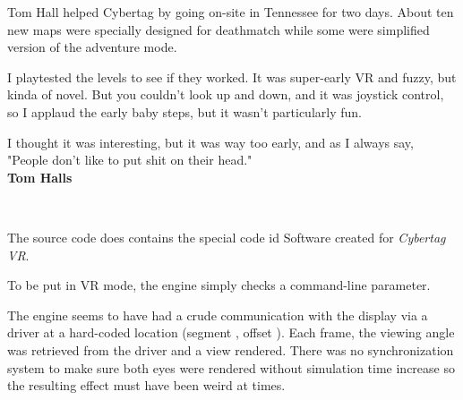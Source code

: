 \begin{figure}[H]
  \centering
{}
 
\end{figure}
\par
Tom Hall helped Cybertag by going on-site in Tennessee for two days. About ten new maps were specially designed for deathmatch while some were simplified version of the adventure mode.\\
\par
\begin{fancyquotes}
I playtested the levels to see if they worked. It was super-early VR and fuzzy, but kinda of novel. But you couldn't look up and down, and it was joystick control, so I applaud the early baby steps, but it wasn't particularly fun.\\
\par

I thought it was interesting, but it was way too early, and as I always say, "People don't like to put shit on their head."
\bigskip \\
\textbf{Tom Halls}
 \end{fancyquotes}\\
\par
The source code does contains the special code id Software created for \textit{Cybertag VR}.\\
\par
{}

To be put in VR mode, the engine simply checks a command-line parameter.\\
\par
{}


The engine seems to have had a crude communication with the display via a driver at a hard-coded location (segment , offset ). Each frame, the viewing angle was retrieved from the driver and a view rendered. There was no synchronization system to make sure both eyes were rendered without simulation time increase so the resulting effect must have been weird at times.\\
\par


